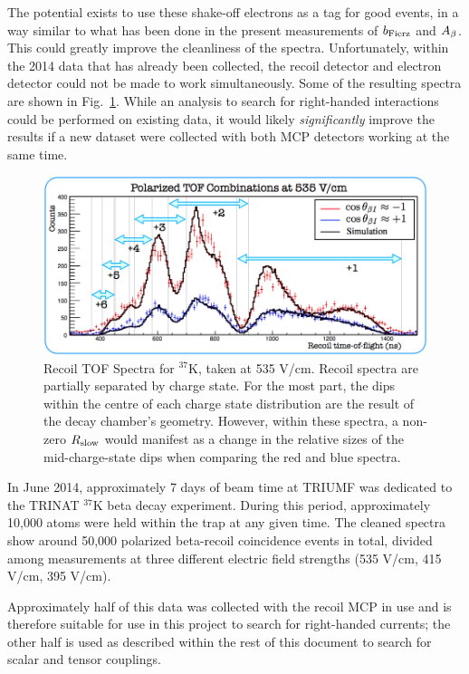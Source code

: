 The potential exists to use these shake-off electrons as a tag for good events, in a way similar to what has been done in the present measurements of $b_{\mathrm{Fierz}}$ and $A_{\beta}$.  This could greatly improve the cleanliness of the spectra.  Unfortunately, within the 2014 data that has already been collected, the recoil detector and electron detector could not be made to work simultaneously.  Some of the resulting spectra are shown in Fig.~\ref{fig:RslowSpectra}.  While an analysis to search for right-handed interactions could be performed on existing data, it would likely \emph{significantly} improve the results if a new dataset were collected with both \ac{MCP} detectors working at the same time. 

\begin{figure}[htb]
	\centering
	\includegraphics[width=.999\linewidth]{Figures/Rslow_tof_squished.png}
	\caption[Recoil TOF Spectra at 535 V/cm]{Recoil TOF Spectra for $^{37}$K, taken at 535 V/cm.  Recoil spectra are partially separated by charge state.  For the most part, the dips within the centre of each charge state distribution are the result of the decay chamber's geometry.  However, within these spectra, a non-zero $R_{\textrm{slow}}$ would manifest as a change in the relative sizes of the mid-charge-state dips when comparing the red and blue spectra.	}
	\label{fig:RslowSpectra}
\end{figure}



In June 2014, approximately 7 days of beam time at TRIUMF was dedicated to the TRINAT $^{37}\textrm{K}$ beta decay experiment.  During this period, approximately 10,000 atoms were held within the trap at any given time.  The cleaned spectra show around 50,000 polarized beta-recoil coincidence events in total, divided among measurements at three different electric field strengths (535 V/cm, 415 V/cm, 395 V/cm).

Approximately half of this data was collected with the recoil MCP in use and is therefore suitable for use in this project to search for right-handed currents;  the other half is used as described within the rest of this document to search for scalar and tensor couplings.   

